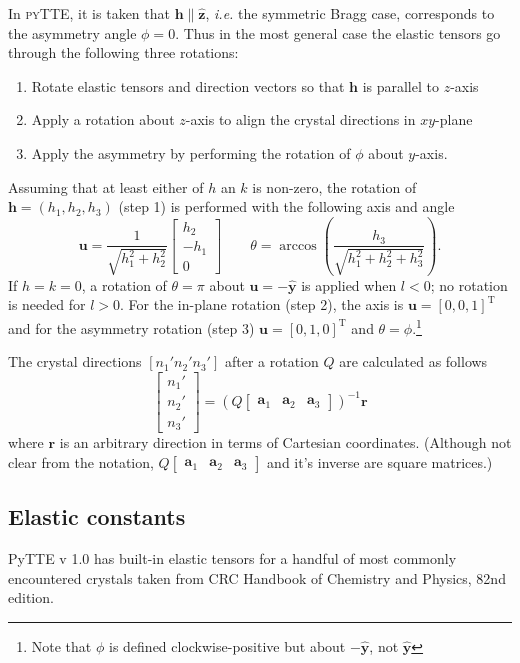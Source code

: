 \documentclass[11pt,a4paper]{article}
\begin{document}
In \textsc{pyTTE}, it is taken that $\mathbf{h} \parallel \hat{\mathbf{z}}$, \emph{i.e.} the symmetric Bragg case, corresponds to the asymmetry angle $\phi=0$. Thus in the most general case the elastic tensors go through the following three rotations:
\begin{enumerate}
\item Rotate elastic tensors and direction vectors so that $\mathbf{h}$ is parallel to $z$-axis
\item Apply a rotation about $z$-axis to align the crystal directions in $xy$-plane
\item Apply the asymmetry by performing the rotation of $\phi$ about $y$-axis.
\end{enumerate}
Assuming that at least either of $h$ an $k$ is non-zero, the rotation of $\mathbf{h}= (h_1,h_2,h_3)$ (step 1) is performed with the following axis and angle
\begin{equation}
\mathbf{u} = \frac{1}{\sqrt{h_1^2 + h_2^2}} \left[\begin{matrix} h_2 \\ -h_1 \\ 0 \end{matrix}\right] \qquad
\theta = \arccos \left( \frac{h_3}{\sqrt{h_1^2 + h_2^2 + h_3^2}} \right).
\end{equation}
If $h=k=0$, a rotation of $\theta = \pi$ about $\mathbf{u} = -\hat{\mathbf{y}}$ is applied when $l<0$; no rotation is needed for $l>0$. For the in-plane rotation (step 2), the axis is $\mathbf{u} = [0,0,1]^{\mathrm{T}}$ and for the asymmetry rotation (step 3) $\mathbf{u} = [0,1,0]^{\mathrm{T}}$ and $\theta = \phi$.\footnote{Note that $\phi$ is defined clockwise-positive but about $-\hat{\mathbf{y}}$, not $\hat{\mathbf{y}}$}

The crystal directions $[n_1' n_2' n_3']$ after a rotation $Q$ are calculated as follows
\begin{equation}
 \left[\begin{matrix} n_1' \\ n_2' \\ n_3' \end{matrix}\right] = 
 (Q \left[\begin{matrix} \mathbf{a}_1 & \mathbf{a}_2 & \mathbf{a}_3 \end{matrix} \right])^{-1} \mathbf{r}
\end{equation}
where $\mathbf{r}$ is an arbitrary direction in terms of Cartesian coordinates. (Although not clear from the notation, $Q \left[\begin{matrix} \mathbf{a}_1 & \mathbf{a}_2 & \mathbf{a}_3 \end{matrix} \right]$ and it's inverse are square matrices.)

\subsection{Elastic constants}
PyTTE v 1.0 has built-in elastic tensors for a handful of most commonly encountered crystals taken from CRC Handbook of Chemistry and Physics, 82nd edition.




\end{document}
